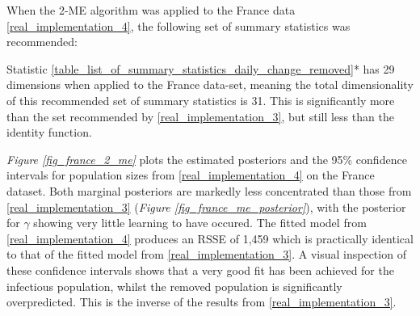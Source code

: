 \documentclass[11pt,a4paper]{article}
\theoremstyle{break}
\begin{document}
    When the 2-ME algorithm was applied to the France data \noindent\ref{real_implementation_4}, the following set of summary statistics was recommended:

  \begin{center}
  \end{center}
  \noindent Statistic \ref{table_list_of_summary_statistics_daily_change_removed}* has 29 dimensions when applied to the France data-set, meaning the total dimensionality of this recommended set of summary statistics is 31. This is significantly more than the set recommended by \ref{real_implementation_3}, but still less than the identity function.

  \par \textit{Figure \ref{fig_france_2_me}} plots the estimated posteriors and the 95\% confidence intervals for population sizes from \ref{real_implementation_4} on the France dataset. Both marginal posteriors are markedly less concentrated than those from \ref{real_implementation_3} (\textit{Figure \ref{fig_france_me_posterior}}), with the posterior for $\gamma$ showing very little learning to have occured. The fitted model from \ref{real_implementation_4} produces an RSSE of 1,459 which is practically identical to that of the fitted model from \ref{real_implementation_3}. A visual inspection of these confidence intervals shows that a very good fit has been achieved for the infectious population, whilst the removed population is significantly overpredicted. This is the inverse of the results from \ref{real_implementation_3}.
\end{document}
